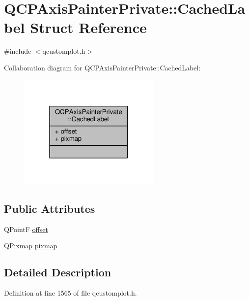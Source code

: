 \hypertarget{struct_q_c_p_axis_painter_private_1_1_cached_label}{}\section{Q\+C\+P\+Axis\+Painter\+Private\+:\+:Cached\+Label Struct Reference}
\label{struct_q_c_p_axis_painter_private_1_1_cached_label}


{\ttfamily \#include $<$qcustomplot.\+h$>$}



Collaboration diagram for Q\+C\+P\+Axis\+Painter\+Private\+:\+:Cached\+Label\+:\nopagebreak
\begin{figure}[H]
\begin{center}
\leavevmode
\includegraphics[width=199pt]{struct_q_c_p_axis_painter_private_1_1_cached_label__coll__graph}
\end{center}
\end{figure}
\subsection*{Public Attributes}
\begin{DoxyCompactItemize}
\item 
Q\+Point\+F \hyperlink{struct_q_c_p_axis_painter_private_1_1_cached_label_a5f502db71c92e572f1e6f44f62c59d8e}{offset}
\item 
Q\+Pixmap \hyperlink{struct_q_c_p_axis_painter_private_1_1_cached_label_a461597cbd470914a9d24b64d16037a88}{pixmap}
\end{DoxyCompactItemize}


\subsection{Detailed Description}


Definition at line 1565 of file qcustomplot.\+h.



